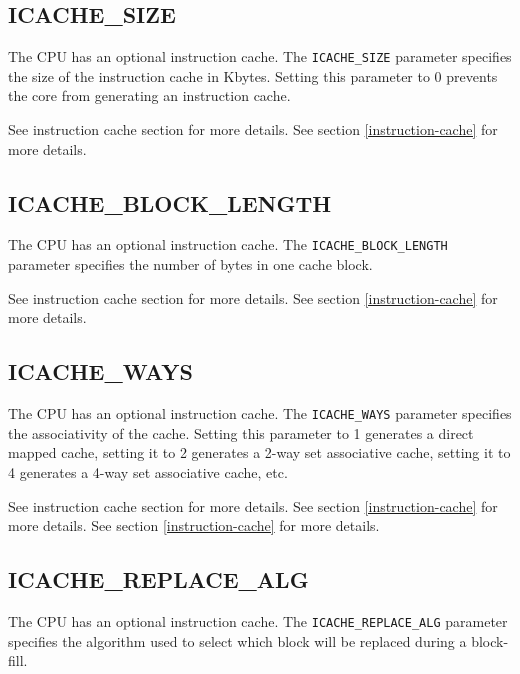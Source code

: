 \subsection{ICACHE\_SIZE}\label{icache_size}

The CPU has an optional instruction cache. The \texttt{ICACHE\_SIZE} parameter
specifies the size of the instruction cache in Kbytes. Setting this parameter to
0 prevents the core from generating an instruction cache.

\ifdefined\MARKDOWN
See instruction cache section for more details.
\else
See section \ref{instruction-cache}  for more details.
\fi


\subsection{ICACHE\_BLOCK\_LENGTH}\label{icache_block_length}

The CPU has an optional instruction cache. The \texttt{ICACHE\_BLOCK\_LENGTH}
parameter specifies the number of bytes in one cache block.

\ifdefined\MARKDOWN
See instruction cache section for more details.
\else
See section \ref{instruction-cache}  for more details.
\fi

\subsection{ICACHE\_WAYS}\label{icache_ways}

The CPU has an optional instruction cache. The \texttt{ICACHE\_WAYS} parameter
specifies the associativity of the cache. Setting this parameter to 1 generates
a direct mapped cache, setting it to 2 generates a 2-way set associative cache,
setting it to 4 generates a 4-way set associative cache, etc.

\ifdefined\MARKDOWN
See instruction cache section for more details.
\else
See section \ref{instruction-cache}  for more details.
\fi
See section \ref{instruction-cache}  for more details.

\subsection{ICACHE\_REPLACE\_ALG}\label{icache_replace_alg}

The CPU has an optional instruction cache. The \texttt{ICACHE\_REPLACE\_ALG}
parameter specifies the algorithm used to select which block will be
replaced during a block-fill.

